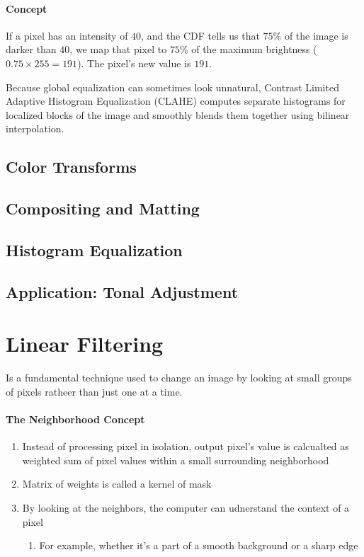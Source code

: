 \documentclass[12pt]{article}
\begin{document}
\paragraph{Concept}

If a pixel has an intensity of $40$, and the CDF tells us that $75\%$ of the image is darker than $40$, we map that pixel to $75\%$ of the maximum brightness ($0.75 \times 255 = 191$). The pixel's new value is $191$.

Because global equalization can sometimes look unnatural, Contrast Limited Adaptive Histogram Equalization (CLAHE) computes separate histograms for localized blocks of the image and smoothly blends them together using bilinear interpolation.



\subsection{Color Transforms}

\subsection{Compositing and Matting}

\subsection{Histogram Equalization}

\subsection{Application: Tonal Adjustment}

\section{Linear Filtering}
Is a fundamental technique used to change an image by looking at small groups of pixels ratheer than just one at a time.

\paragraph{The Neighborhood Concept}
\begin{enumerate}
    \item Instead of processing pixel in isolation, output pixel's value is calcualted as weighted sum of pixel values within a small surrounding neighborhood
    \item Matrix of weights is called a kernel of mask
    \item By looking at the neighbors, the computer can udnerstand the context of a pixel
          \begin{enumerate}
              \item For example, whether it's a part of a smooth background or a sharp edge
          \end{enumerate}
\end{enumerate}
\end{document}
